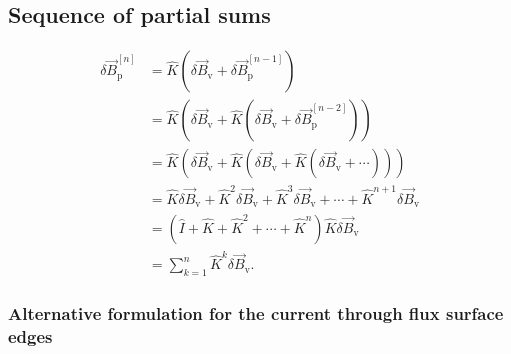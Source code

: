 \subsection{Sequence of partial sums}

\begin{align}
  \delta \vec{B}_{\text{p}}^{[n]} &= \hat{K} \left ( \delta \vec{B}_{\text{v}} + \delta \vec{B}_{\text{p}}^{[n-1]} \right ) \nonumber \\
  &= \hat{K} \left ( \delta \vec{B}_{\text{v}} + \hat{K} \left ( \delta \vec{B}_{\text{v}} + \delta \vec{B}_{\text{p}}^{[n-2]} \right ) \right ) \nonumber \\
  &= \hat{K} \left ( \delta \vec{B}_{\text{v}} + \hat{K} \left ( \delta \vec{B}_{\text{v}} + \hat{K} \left ( \delta \vec{B}_{\text{v}} + \dotsb \right ) \right ) \right ) \nonumber \\
  &= \hat{K} \delta \vec{B}_{\text{v}} + \hat{K}^{2} \delta \vec{B}_{\text{v}} + \hat{K}^{3} \delta \vec{B}_{\text{v}} + \dotsb + \hat{K}^{n+1} \delta \vec{B}_{\text{v}} \nonumber \\
  &= \left ( \hat{I} + \hat{K} + \hat{K}^{2} + \dotsb + \hat{K}^{n} \right ) \hat{K} \delta \vec{B}_{\text{v}} \nonumber \\
  &= \sum_{k = 1}^{n} \hat{K}^{k} \delta \vec{B}_{\text{v}}.
\end{align}


\subsubsection{Alternative formulation for the current through flux surface edges}

